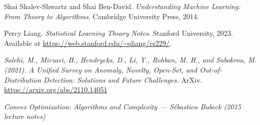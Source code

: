\documentclass[11pt]{article}
\theoremstyle{plain}
\begin{document}
\begin{thebibliography}{99}

Shai Shalev-Shwartz and Shai Ben-David.
\newblock \emph{Understanding Machine Learning: From Theory to Algorithms}.
\newblock Cambridge University Press, 2014.

Percy Liang.
\newblock \emph{Statistical Learning Theory Notes}.
\newblock Stanford University, 2023.
\newblock Available at \url{https://web.stanford.edu/~pliang/cs229/}.

\newblock \emph{Salehi, M., Mirzaei, H., Hendrycks, D., Li, Y., Rohban, M. H., and Sabokrou, M. (2021). A Unified Survey on Anomaly, Novelty, Open-Set, and Out-of-Distribution Detection: Solutions and Future Challenges.}
\newblock ArXiv. \url{https://arxiv.org/abs/2110.14051}

\newblock \emph{Convex Optimization: Algorithms and Complexity — Sébastien Bubeck (2015 lecture notes)}


\end{thebibliography}
\end{document}
